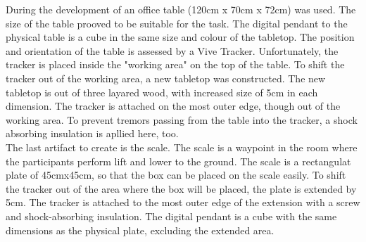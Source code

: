 During the development of \exgo an office table (120cm x 70cm x 72cm) was used. The size of the table prooved to be suitable for the task. The digital pendant to the physical table is a cube in the same size and colour of the tabletop. The position and orientation of the table is assessed by a Vive Tracker. Unfortunately, the tracker is placed inside the "working area" on the top of the table. To shift the tracker out of the working area, a new tabletop was constructed. The new tabletop is out of three layared wood, with increased size of 5cm in each dimension. The tracker is attached on the most outer edge, though out of the working area. To prevent tremors passing from the table into the tracker, a shock absorbing insulation is apllied here, too.\\
The last artifact to create is the scale. The scale is a waypoint in the room where the participants perform lift and lower to the ground. The scale is a rectangulat plate of 45cmx45cm, so that the box can be placed on the scale easily. To shift the tracker out of the area where the box will be placed, the plate is extended by 5cm. The tracker is attached to the most outer edge of the extension with a screw and shock-absorbing insulation. The digital pendant is a cube with the same dimensions as the physical plate, excluding the extended area.\\

